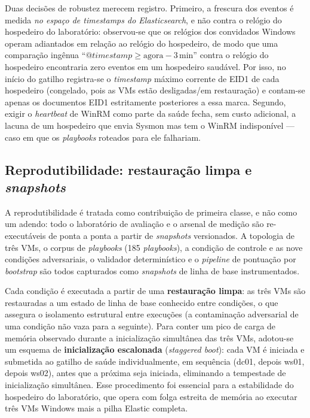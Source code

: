 Duas decisões de robustez merecem registro. Primeiro, a frescura dos eventos é
medida \emph{no espaço de \textit{timestamps} do Elasticsearch}, e não contra o
relógio do hospedeiro do laboratório: observou-se que os relógios dos convidados
Windows operam adiantados em relação ao relógio do hospedeiro, de modo que uma
comparação ingênua ``$@timestamp \geq \text{agora} - 3\,\text{min}$'' contra o
relógio do hospedeiro encontraria zero eventos em um hospedeiro saudável. Por
isso, no início do gatilho registra-se o \textit{timestamp} máximo corrente de
EID1 de cada hospedeiro (congelado, pois as VMs estão desligadas/em restauração)
e contam-se apenas os documentos EID1 estritamente posteriores a essa marca.
Segundo, exigir o \textit{heartbeat} de WinRM como parte da saúde fecha, sem
custo adicional, a lacuna de um hospedeiro que envia Sysmon mas tem o WinRM
indisponível --- caso em que os \textit{playbooks} roteados para ele falhariam.

\subsection{Reprodutibilidade: restauração limpa e \textit{snapshots}}
\label{subsec:reprodutibilidade}

A reprodutibilidade é tratada como contribuição de primeira classe, e não como
um adendo: todo o laboratório de avaliação e o arsenal de medição são
re-executáveis de ponta a ponta a partir de \textit{snapshots} versionados. A
topologia de três VMs, o corpus de \textit{playbooks} (185 \textit{playbooks}),
a condição de controle e as nove condições adversariais, o validador
determinístico e o \textit{pipeline} de pontuação por \textit{bootstrap} são
todos capturados como \textit{snapshots} de linha de base instrumentados.

Cada condição é executada a partir de uma \textbf{restauração limpa}: as três
VMs são restauradas a um estado de linha de base conhecido entre condições, o que
assegura o isolamento estrutural entre execuções (a contaminação adversarial de
uma condição não vaza para a seguinte). Para conter um pico de carga de memória
observado durante a inicialização simultânea das três VMs, adotou-se um esquema
de \textbf{inicialização escalonada} (\textit{staggered boot}): cada VM é
iniciada e submetida ao gatilho de saúde individualmente, em sequência (dc01,
depois ws01, depois ws02), antes que a próxima seja iniciada, eliminando a
tempestade de inicialização simultânea. Esse procedimento foi essencial para a
estabilidade do hospedeiro do laboratório, que opera com folga estreita de
memória ao executar três VMs Windows mais a pilha Elastic completa.


